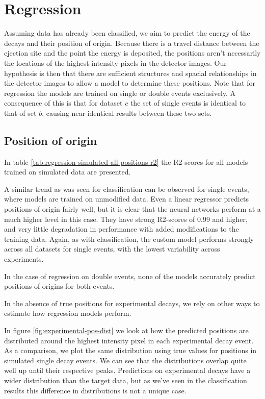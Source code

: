 \section{Regression}
Assuming data has already been classified, we aim to predict the energy of the decays and their
position of origin. Because there is a travel distance between the 
ejection site and the point the energy is deposited, the positions aren't necessarily
the locations of the highest-intensity pixels in the detector images. Our hypothesis is
then that there are sufficient structures and spacial relationships in the detector images to
allow a model to determine these positions.
Note that for regression the models are trained on single or double events exclusively.
A consequence of this is that for dataset $c$ the set of single events is
identical to that of set $b$, causing near-identical results between these two sets.

\subsection{Position of origin}
In table \ref{tab:regression-simulated-all-positions-r2} the R2-scores for all models
trained on simulated data are presented.

\noindent A similar trend as was seen for classification
can be observed for single events, where models are trained on unmodified data. Even
a linear regressor predicts positions of origin fairly well, but it is clear
that the neural networks perform at a much higher level in this case. They have strong
R2-scores of 0.99 and higher, and very little degradation in performance with added 
modifications to the training data. Again, as with classification, the custom model
performs strongly across all datasets for single events, with the lowest variability across
experiments.

In the case of regression on double events, none of the models accurately
predict positions of origins for both events.

In the absence of true positions for experimental decays, we rely on other
ways to estimate how regression models perform.

In figure \ref{fig:experimental-pos-dist} we look at how the predicted positions
are distributed around the highest intensity pixel in each experimental decay event.
As a comparison, we plot the same distribution using true values for positions in
simulated single decay events. We can see that the distributions overlap quite well
up until their respective peaks. Predictions on experimental decays have a wider
distribution than the target data, but as we've seen in the classification results this
difference in distributions is not a unique case.

